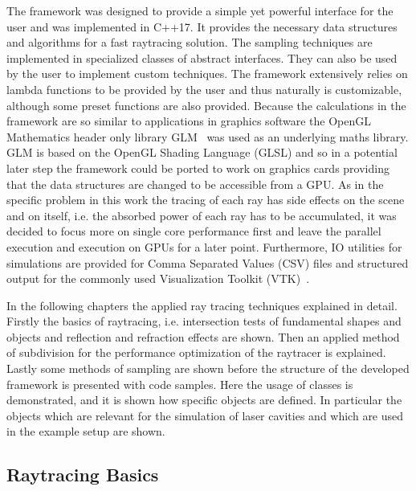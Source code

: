 \documentclass[a4paper,10pt]{article}
\begin{document}
    The framework was designed to provide a simple yet powerful
    interface for the user and was implemented in C++17.
    It provides the necessary data structures and algorithms for
    a fast raytracing solution.
    The sampling techniques are implemented in specialized classes
    of abstract interfaces. 
    They can also be used by the user to 
    implement custom techniques.
    The framework extensively relies on lambda functions to be
    provided by the user and thus naturally is customizable,
    although some preset functions are also provided.
    Because the calculations in the framework are so similar to applications
    in graphics software the OpenGL Mathematics header only library
    GLM~\cite{glm} was used as an underlying maths library.
    GLM is based on the OpenGL Shading Language (GLSL) and so in a 
    potential later step the framework
    could be ported to work on graphics cards providing that the
    data structures are changed to be accessible from a GPU.
    As in the specific problem in this work the tracing of each ray
    has side effects on the scene and on itself,
    i.e. the absorbed power of each ray has to be accumulated,
    it was decided to focus more on single core performance first
    and leave the parallel execution and execution on GPUs for a 
    later point.
    Furthermore, IO utilities for simulations are provided for Comma 
    Separated Values (CSV) files and structured output for the 
    commonly used Visualization Toolkit (VTK)~\cite{vtk}.

    In the following chapters the applied ray tracing techniques 
    explained in detail.
    Firstly the basics of raytracing, i.e. intersection tests of
    fundamental shapes and objects and reflection and refraction effects
    are shown.
    Then an applied method of subdivision for the performance optimization
    of the raytracer is explained.
    Lastly some methods of sampling are shown before the structure of the 
    developed framework is presented with code samples.
    Here the usage of classes is demonstrated, and it is shown how specific
    objects are defined.
    In particular the objects which are relevant for the simulation
    of laser cavities and which are used in the example setup are shown.

    \subsection{Raytracing Basics}  \label{sec:raytracing_basics}
\end{document}
